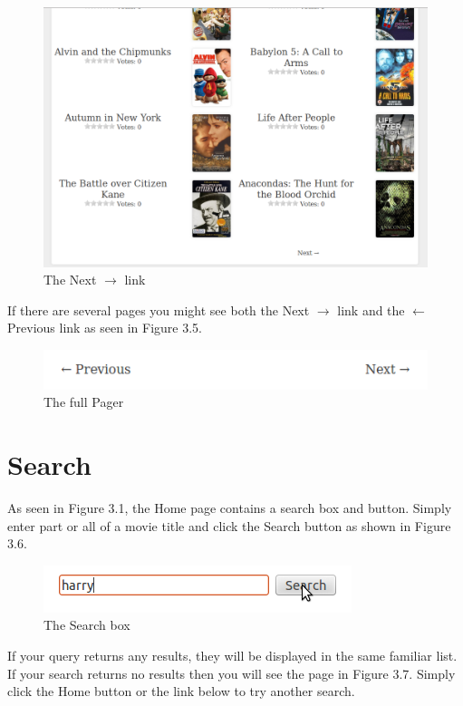 \documentclass[10pt,a4paper]{scrreprt}
\begin{document}
\begin{figure}[H]
\centering
\includegraphics[scale=.25]{notrated.png}
\caption{The Next $\rightarrow$ link}
\end{figure}

If there are several pages you might see both the Next $\rightarrow$ link and the $\leftarrow$ Previous link as seen in Figure 3.5.

\begin{figure}[H]
\centering
\includegraphics[scale=.5]{pager.png}
\caption{The full Pager}
\end{figure}

\section{Search}
As seen in Figure 3.1, the Home page contains a search box and button. Simply enter part or all of a movie title and click the Search button as shown in Figure 3.6.

\begin{figure}[H]
\centering
\includegraphics[scale=.5]{searchbox.png}
\caption{The Search box}
\end{figure}

If your query returns any results, they will be displayed in the same familiar list. If your search returns no results then you will see the page in Figure 3.7. Simply click the Home button or the link below to try another search.
\end{document}

